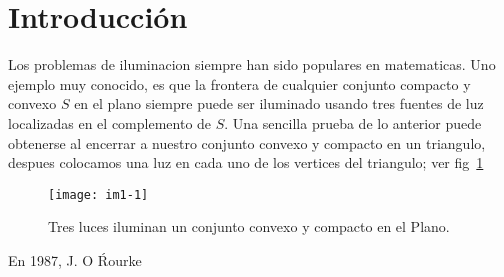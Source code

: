 \chapter*{Introducción}

Los problemas de iluminacion siempre han sido populares en matematicas. Uno
ejemplo muy conocido, es que la frontera de cualquier conjunto compacto y
convexo $S$ en el plano siempre puede ser iluminado usando tres fuentes de luz
localizadas en el complemento de $S$. Una sencilla prueba de lo anterior puede
obtenerse al encerrar a nuestro conjunto convexo y compacto en un triangulo,
despues colocamos una luz en cada uno de los vertices del triangulo; ver
fig~\ref{im1-1} \\

\begin{figure}[h]
	\centering
	\texttt{[image: im1-1]}
	\caption{Tres luces iluminan un conjunto convexo y compacto en el Plano.
	\label{im1-1}}
\end{figure}

En 1987, J. O \'Rourke \cite{aguilar_iluminacion_2013}

